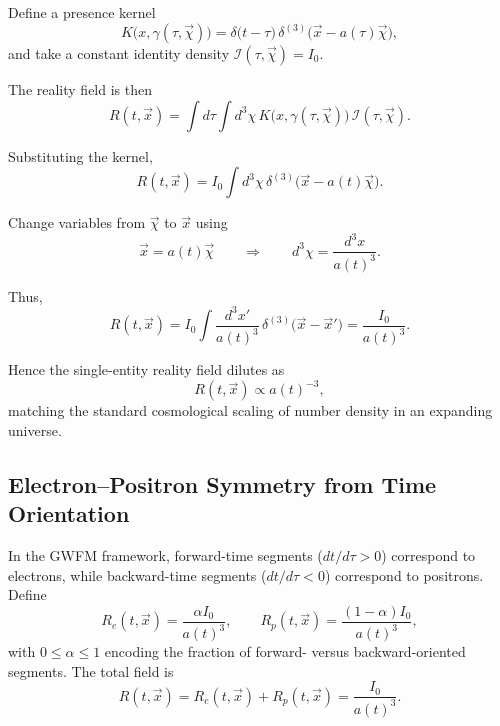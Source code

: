 Define a presence kernel
\begin{equation}
K\big(x,\gamma(\tau,\vec{\chi})\big)
= \delta\!\big(t - \tau\big)\,
  \delta^{(3)}\!\big(\vec{x} - a(\tau)\vec{\chi}\big),
\end{equation}
and take a constant identity density $\mathcal{I}(\tau,\vec{\chi}) = I_0$.

The reality field is then
\begin{equation}
R(t,\vec{x})
= \int d\tau \int d^3\chi \,
K\big(x,\gamma(\tau,\vec{\chi})\big)\,
\mathcal{I}(\tau,\vec{\chi}).
\end{equation}

Substituting the kernel,
\begin{equation}
R(t,\vec{x})
= I_0 \int d^3\chi \,
\delta^{(3)}\!\big(\vec{x} - a(t)\vec{\chi}\big).
\end{equation}

Change variables from $\vec{\chi}$ to $\vec{x}$ using
\begin{equation}
\vec{x} = a(t)\vec{\chi}
\qquad\Rightarrow\qquad
d^3\chi = \frac{d^3x}{a(t)^3}.
\end{equation}

Thus,
\begin{equation}
R(t,\vec{x})
= I_0 \int \frac{d^3x'}{a(t)^3}\,
\delta^{(3)}\!\big(\vec{x} - \vec{x}'\big)
= \frac{I_0}{a(t)^3}.
\end{equation}

Hence the single-entity reality field dilutes as
\begin{equation}
R(t,\vec{x}) \propto a(t)^{-3},
\end{equation}
matching the standard cosmological scaling of number density in an expanding universe.

\subsection{Electron--Positron Symmetry from Time Orientation}

In the GWFM framework, forward-time segments ($dt/d\tau > 0$) correspond to electrons,
while backward-time segments ($dt/d\tau < 0$) correspond to positrons. Define
\begin{equation}
R_e(t,\vec{x}) = \frac{\alpha I_0}{a(t)^3}, \qquad
R_p(t,\vec{x}) = \frac{(1-\alpha) I_0}{a(t)^3},
\end{equation}
with $0 \le \alpha \le 1$ encoding the fraction of forward- versus backward-oriented
segments. The total field is
\begin{equation}
R(t,\vec{x}) = R_e(t,\vec{x}) + R_p(t,\vec{x})
= \frac{I_0}{a(t)^3}.
\end{equation}

